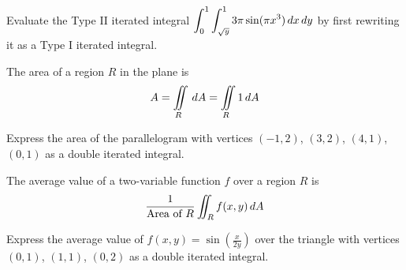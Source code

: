 \documentclass[letterpaper, twoside, 12pt]{book}
\begin{document}
          \begin{contributors}

          \end{contributors}

          \begin{problem}
            Evaluate the Type II iterated integral
            $\displaystyle\int_0^1\int_{\sqrt{y}}^1 3\pi \sin(\pi x^3)\,d{x}\,d{y}$
            by first rewriting it as a Type I iterated integral.
          \end{problem}

          \begin{solution}

          \end{solution}

          \begin{contributors}

          \end{contributors}

\begin{theorem}
  The area of a region $R$ in the plane is
  \[A = \iint\limits_R\,dA=\iint\limits_R 1\,d{A}\]
\end{theorem}

          \begin{problem}
            Express the area of the parallelogram with vertices
            $(-1,2)$, $(3,2)$, $(4,1)$, $(0,1)$
            as a double iterated integral.
          \end{problem}

          \begin{solution}

          \end{solution}

          \begin{contributors}

          \end{contributors}

\begin{definition}
  The average value of a two-variable function $f$ over a region $R$ is
  \[
    \frac{1}{\text{Area of }R}\iint_R f(x,y)\,d{A}
  \]
\end{definition}

          \begin{problem}
            Express the average value of $f(x,y)=\sin(\frac{x}{2y})$ over
            the triangle with vertices $(0,1)$, $(1,1)$, $(0,2)$
            as a double iterated integral.
          \end{problem}
\end{document}
